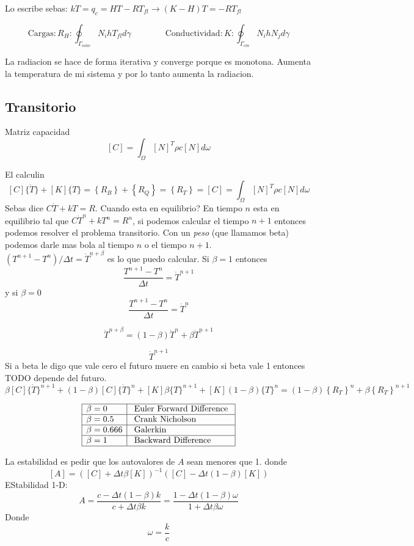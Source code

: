 \documentclass[11pt, a4paper,titlepage]{article}
\begin{document}
Lo escribe sebas: $kT=q_c = HT-RT_{fl} \longrightarrow (K-H)T = -R T_{fl}$

\[
\mathrm{Cargas:} R_{H} : \oint_{\Gamma_{c o n v}} N_{i} h T_{f l} d \gamma \qquad \qquad \mathrm{Conductividad:}  K : \oint_{\Gamma_{c m}} N_{i} h N_{j} d \gamma
\]

La radiacion se hace de forma iterativa y converge porque es monotona. Aumenta la temperatura de mi sistema y por lo tanto aumenta la radiacion.

\subsection{Transitorio}

Matriz capacidad
\[
[C]=\int_{\Omega}[N]^{T} \rho c[N] d \omega
\]

El calculin
\[
[C]\{\dot{T}\}+[K]\{T\}=\left\{R_{B}\right\}+\left\{R_{Q}\right\}=\left\{R_{T}\right\} = [C]=\int_{\Omega}[N]^{T} \rho c[N] d \omega
\]
Sebas dice $C\dot{T}+kT = R$. Cuando esta en equilibrio? En tiempo $n$ esta en equilibrio tal que $C\dot{T}^n +kT^n = R^n$, si podemos calcular el tiempo $n+1$ entonces podemos resolver el problema transitorio. Con un \textit{peso} (que llamamos beta) podemos darle mas bola al tiempo $n$ o el tiempo $n+1$.
$(T^{n+1}-T^n)/\Delta t = \dot{T}^{n+\beta}$ es lo que puedo calcular. Si $\beta=1$ entonces
\[
\frac{T^{n+1}-T^n}{\Delta t} = \dot{T}^{n+1}
\]
y si $\beta=0$
\[
\frac{T^{n+1}-T^n}{\Delta t} = \dot{T}^{n}
\]

\[
\dot{T}^{n+\beta} = (1-\beta)\dot{T}^n +\beta \dot{T}^{n+1}
\]

\[
\dot{T}^{n+1} 
\]
Si a beta le digo que vale cero el futuro muere en cambio si beta vale 1 entonces TODO depende del futuro.
\[
\beta[C]\{\dot{T}\}^{n+1}+(1-\beta)[C]\{\dot{T}\}^{n}+[K] \beta\{T\}^{n+1}+[K](1-\beta)\{T\}^{n}=(1-\beta)\left\{R_{T}\right\}^{n}+\beta\left\{R_{T}\right\}^{n+1}
\]

\[
\begin{array}{|l|l|}\hline \beta=0 & {\text { Euler Forward Difference }} \\ \hline \beta=0.5 & {\text { Crank Nicholson }} \\ \hline \beta=0.666 & {\text { Galerkin }} \\ \hline \beta=1 & {\text { Backward Difference }} \\ \hline\end{array}
\]


La estabilidad es pedir que los autovalores de $A$ sean menores que 1.
donde 
\[
[A]=([C]+\Delta t \beta[K])^{-1}([C]-\Delta t(1-\beta)[K])
\]
EStabilidad 1-D:
\[
A=\frac{c-\Delta t(1-\beta) k}{c+\Delta t \beta k}=\frac{1-\Delta t(1-\beta) \omega}{1+\Delta t \beta \omega}
\]
Donde
\[
\omega = \frac{k}{c}
\]
\end{document}
